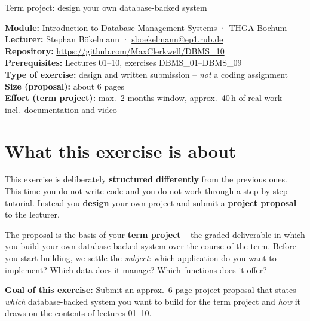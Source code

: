 \documentclass[11pt,a4paper]{article}
\begin{document}
\thispagestyle{empty}
%
{Term project: design your own database-backed system}

\begin{infobox}
\textbf{Module:} Introduction to Database Management Systems · THGA Bochum \\
\textbf{Lecturer:} Stephan Bökelmann · \href{mailto:sboekelmann@ep1.rub.de}{sboekelmann@ep1.rub.de} \\
\textbf{Repository:} \url{https://github.com/MaxClerkwell/DBMS_10} \\
\textbf{Prerequisites:} Lectures 01--10, exercises DBMS\_01--DBMS\_09 \\
\textbf{Type of exercise:} design and written submission -- \emph{not} a coding assignment \\
\textbf{Size (proposal):} about 6 pages \\
\textbf{Effort (term project):} max.\ 2 months window, approx.\ 40\,h of real work incl.\ documentation and video
\end{infobox}

\tableofcontents
\vspace{1em}

\section{What this exercise is about}

This exercise is deliberately \textbf{structured differently} from the previous
ones. This time you do not write code and you do not work through a
step-by-step tutorial. Instead you \textbf{design} your own project and submit a
\textbf{project proposal} to the lecturer.

The proposal is the basis of your \textbf{term project} -- the graded
deliverable in which you build your own database-backed system over the course
of the term. Before you start building, we settle the \emph{subject}: which
application do you want to implement? Which data does it manage? Which functions
does it offer?

\begin{infobox}
\textbf{Goal of this exercise:} Submit an approx.\ 6-page project proposal that states
\emph{which} database-backed system you want to build for the term project and
\emph{how} it draws on the contents of lectures 01--10.
\end{infobox}
\end{document}
